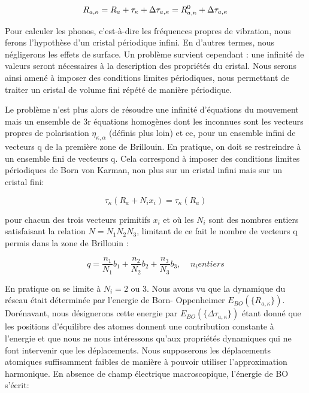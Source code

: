 \begin{equation}
R_{a,\kappa} = R_{a}+ \tau_{\kappa} + \Delta\tau_{a,\kappa}\\
= R^{0}_{a,\kappa} + \Delta\tau_{a,\kappa}
\end{equation}

Pour calculer les phonos, c'est-à-dire les fréquences propres de vibration, nous ferons l'hypothèse d'un cristal périodique infini. En d'autres termes, nous négligerons les effets de surface. Un problème survient cependant : une infinité de valeurs seront nécessaires à la description des propriétés du cristal. Nous serons ainsi amené à imposer des conditions limites périodiques, nous permettant de traiter un cristal de volume fini répété de manière périodique. 

Le problème n'est plus alors de résoudre une infinité d'équations du mouvement mais un ensemble de 3r équations homogènes dont les inconnues sont les vecteurs propres de polarisation $\eta_{\kappa,\alpha}$ (définis plus loin) et ce, pour un ensemble infini de vecteurs q de la première zone de Brillouin. En pratique, on doit se restreindre à un ensemble fini de vecteurs q. Cela correspond à imposer des conditions limites périodiques de Born von Karman, non plus sur un cristal infini mais sur un cristal fini:

\begin{equation}
\tau_{\kappa}(R_{a} + N_{i}x_{i}) = \tau_{\kappa}(R_{a})
\end{equation}

pour chacun des trois vecteurs primitifs $x_{i}$ et où les $N_{i}$ sont des nombres entiers satisfaisant la relation $N=N_{1}N_{2}N_{3}$, limitant de ce fait le nombre de vecteurs q permis dans la zone de Brillouin :

\begin{equation}
q= \frac{n_{1}}{N_{1}}b_{1}+ \frac{n_{2}}{N_{2}}b_{2}+ \frac{n_{3}}{N_{3}}b_{3}, \; \; \; \;     n_{i}  entiers
\end{equation}

En pratique on se limite  à $N_{i} =2$ ou 3. Nous avons vu que la dynamique du réseau était déterminée par l'energie de Born- Oppenheimer $E_{BO}(\{R_{a,\kappa}\})$. Dorénavant, nous désignerons cette energie par $E_{BO}(\{\Delta\tau_{a,\kappa}\})$ étant donné que les positions d'équilibre des atomes donnent une contribution constante  à l'energie et que nous ne nous intéressons qu'aux propriétés dynamiques qui ne font intervenir que les déplacements. Nous supposerons les déplacements atomiques suffisamment faibles de manière à pouvoir utiliser l'approximation harmonique\cite{}. En absence de champ électrique macroscopique, l'énergie de BO s'écrit:

